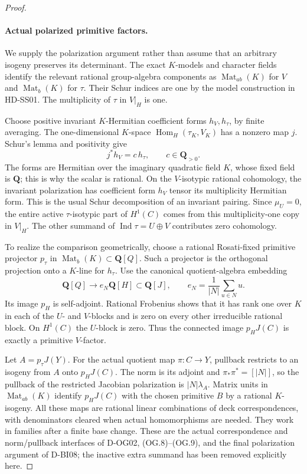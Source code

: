 \begin{proof}
\paragraph{Actual polarized primitive factors.}
We supply the polarization argument rather than assume that an
arbitrary isogeny preserves its determinant. The exact \(K\)-models
and character fields identify the relevant rational group-algebra
components as \(\operatorname{Mat}_{ab}(K)\) for \(V\) and
\(\operatorname{Mat}_b(K)\) for \(\tau\).
Their Schur indices are one by the model construction in HD-SS01.
The multiplicity of \(\tau\) in \(V|_H\) is one.

Choose positive invariant \(K\)-Hermitian coefficient forms
\(h_V,h_\tau\), by finite averaging. The one-dimensional \(K\)-space
\(\operatorname{Hom}_H(\tau_K,V_K)\) has a nonzero map \(j\).
Schur's lemma and positivity give
\[
                    j^*h_V=c\,h_\tau,\qquad c\in\mathbf Q_{>0}.
 \tag{SSK.10}
\]
The forms are Hermitian over the imaginary quadratic field \(K\),
whose fixed field is \(\mathbf Q\); this is why the scalar is rational.
On the \(V\)-isotypic rational cohomology, the invariant polarization
has coefficient form \(h_V\) tensor its multiplicity Hermitian form.
This is the usual Schur decomposition of an invariant pairing.
Since \(\mu_U=0\), the entire active \(\tau\)-isotypic part of
\(H^1(C)\) comes from this multiplicity-one copy in \(V|_H\).
The other summand of \(\operatorname{Ind}\tau=U\oplus V\) contributes
zero cohomology.

To realize the comparison geometrically, choose a rational
Rosati-fixed primitive projector \(p_\tau\) in
\(\operatorname{Mat}_b(K)\subset\mathbf Q[Q]\). Such a projector
is the orthogonal projection onto a \(K\)-line for \(h_\tau\).
Use the canonical quotient-algebra embedding
\[
 \mathbf Q[Q]\longrightarrow e_N\mathbf Q[H]\subset\mathbf Q[J],
 \qquad e_N=\frac1{|N|}\sum_{u\in N}u .
 \tag{SSK.11}
\]
Its image \(p_H\) is self-adjoint. Rational Frobenius shows that
it has rank one over \(K\) in each of the \(U\)- and \(V\)-blocks
and is zero on every other irreducible rational block.
On \(H^1(C)\) the \(U\)-block is zero. Thus the connected image
\(p_HJ(C)\) is exactly a primitive \(V\)-factor.

Let \(A=p_\tau J(Y)\). For the actual quotient map
\(\pi:C\longrightarrow Y\), pullback restricts to an isogeny
from \(A\) onto \(p_HJ(C)\). The norm is its adjoint and
\(\pi_*\pi^*=[|N|]\), so the pullback of the restricted Jacobian
polarization is \(|N|\lambda_A\). Matrix units in
\(\operatorname{Mat}_{ab}(K)\) identify \(p_HJ(C)\) with the
chosen primitive \(B\) by a rational \(K\)-isogeny. All these maps
are rational linear combinations of deck correspondences, with
denominators cleared when actual homomorphisms are needed.
They work in families after a finite base change.
These are the actual correspondence and norm/pullback interfaces
of D-OG02, (OG.8)--(OG.9), and the final polarization argument
of D-BI08; the inactive extra summand has been removed explicitly here.


\end{proof}
